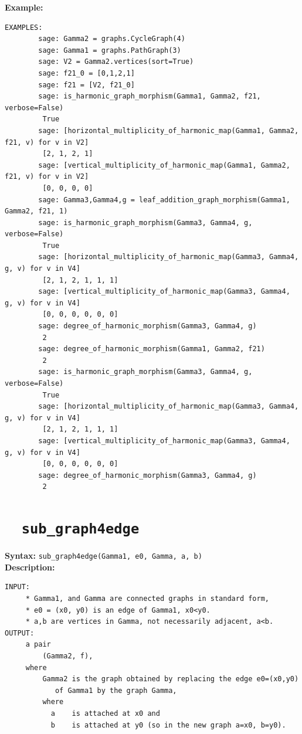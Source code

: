 \documentclass{article}
\begin{document}
\textbf{Example:}
\begin{verbatim}
EXAMPLES:
        sage: Gamma2 = graphs.CycleGraph(4)
        sage: Gamma1 = graphs.PathGraph(3)
        sage: V2 = Gamma2.vertices(sort=True)
        sage: f21_0 = [0,1,2,1]
        sage: f21 = [V2, f21_0]
        sage: is_harmonic_graph_morphism(Gamma1, Gamma2, f21, verbose=False)
         True
        sage: [horizontal_multiplicity_of_harmonic_map(Gamma1, Gamma2, f21, v) for v in V2]
         [2, 1, 2, 1]
        sage: [vertical_multiplicity_of_harmonic_map(Gamma1, Gamma2, f21, v) for v in V2]
         [0, 0, 0, 0]
        sage: Gamma3,Gamma4,g = leaf_addition_graph_morphism(Gamma1, Gamma2, f21, 1)
        sage: is_harmonic_graph_morphism(Gamma3, Gamma4, g, verbose=False)
         True
        sage: [horizontal_multiplicity_of_harmonic_map(Gamma3, Gamma4, g, v) for v in V4]
         [2, 1, 2, 1, 1, 1]
        sage: [vertical_multiplicity_of_harmonic_map(Gamma3, Gamma4, g, v) for v in V4]
         [0, 0, 0, 0, 0, 0]
        sage: degree_of_harmonic_morphism(Gamma3, Gamma4, g)
         2
        sage: degree_of_harmonic_morphism(Gamma1, Gamma2, f21)
         2
        sage: is_harmonic_graph_morphism(Gamma3, Gamma4, g, verbose=False)
         True
        sage: [horizontal_multiplicity_of_harmonic_map(Gamma3, Gamma4, g, v) for v in V4]
         [2, 1, 2, 1, 1, 1]
        sage: [vertical_multiplicity_of_harmonic_map(Gamma3, Gamma4, g, v) for v in V4]
         [0, 0, 0, 0, 0, 0]
        sage: degree_of_harmonic_morphism(Gamma3, Gamma4, g)
         2
\end{verbatim}

\section{\tt \ \ sub\_graph4edge}

\textbf{Syntax:} \verb}sub_graph4edge(Gamma1, e0, Gamma, a, b)}\\

\textbf{Description:}
\begin{verbatim}
INPUT:
     * Gamma1, and Gamma are connected graphs in standard form,
     * e0 = (x0, y0) is an edge of Gamma1, x0<y0.
     * a,b are vertices in Gamma, not necessarily adjacent, a<b.
OUTPUT:
     a pair 
         (Gamma2, f), 
     where
         Gamma2 is the graph obtained by replacing the edge e0=(x0,y0) 
            of Gamma1 by the graph Gamma, 
         where 
           a    is attached at x0 and 
           b    is attached at y0 (so in the new graph a=x0, b=y0).
\end{verbatim}
    
\end{document}
